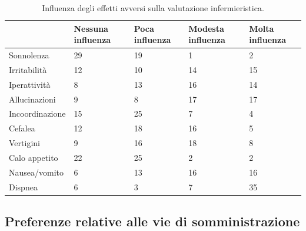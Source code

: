 \newpage

\bgroup
\def\arraystretch{1.5}
\begin{table}[!h]
    \centering
    \begin{tabular}{p{} p{} p{} p{} p{}}
  & \footnotesize{Nessuna influenza} & \footnotesize{Poca influenza} & \footnotesize{Modesta influenza} & \footnotesize{Molta influenza}\\ \hline
    \footnotesize{Sonnolenza} & \footnotesize29 & \footnotesize19 & \footnotesize1 & \footnotesize2\\ \hline
    \footnotesize{Irritabilità} & \footnotesize12 & \footnotesize10 & \footnotesize14 & \footnotesize15\\ \hline
    \footnotesize{Iperattività} & \footnotesize8 & \footnotesize13 & \footnotesize16 & \footnotesize14\\ \hline
    \footnotesize{Allucinazioni} & \footnotesize9 & \footnotesize8 & \footnotesize17 & \footnotesize17\\ \hline
    \footnotesize{Incoordinazione} & \footnotesize15 & \footnotesize25 & \footnotesize7 & \footnotesize4\\ \hline
    \footnotesize{Cefalea} & \footnotesize12 & \footnotesize18 & \footnotesize16 & \footnotesize5\\ \hline
    \footnotesize{Vertigini}  & \footnotesize9 & \footnotesize16 & \footnotesize18 & \footnotesize8\\ \hline
    \footnotesize{Calo appetito} & \footnotesize22 & \footnotesize25 & \footnotesize2 & \footnotesize2\\ \hline
    \footnotesize{Nausea/vomito} & \footnotesize6 & \footnotesize13 & \footnotesize16 & \footnotesize16\\ \hline
    \footnotesize{Dispnea} & \footnotesize6 & \footnotesize3 & \footnotesize7 & \footnotesize35\\ \hline

    \end{tabular}
    \caption{Influenza degli effetti avversi sulla valutazione infermieristica.}
    \label{tab:effavv2}
\end{table}
\egroup



\subsection*{Preferenze relative alle vie di somministrazione}

